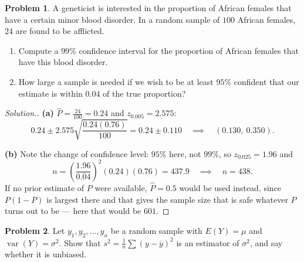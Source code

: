 \documentclass[11pt,a4paper]{article}
\theoremstyle{definition}
\newtheorem{problemx}{Problem}[section]
\newenvironment{problem}{\begin{problemx}}{\end{problemx}}
\newenvironment{solution}
  {\renewcommand{\qedsymbol}{}\begin{proof}[\textit{Solution}.]}
  {\end{proof}}
\begin{document}
\begin{problem}
A geneticist is interested in the proportion of African females that have a certain minor
blood disorder. In a random sample of $100$ African females, $24$ are found to be afflicted.
\begin{enumerate}
\item[(a).] Compute a $99\%$ confidence interval for the proportion of African females that
have this blood disorder.
\item[(b).] How large a sample is needed if we wish to be at least $95\%$ confident that our
estimate is within $0.04$ of the true proportion?
\end{enumerate}
\end{problem}

\begin{solution}
\textbf{(a)} $\hat{P}=\frac{24}{100}=0.24$ and $z_{0.005}=2.575$:
\[0.24\pm 2.575\sqrt{\frac{0.24(0.76)}{100}}=0.24\pm 0.110
\quad\implies\quad (0.130,\ 0.350).\]

\textbf{(b)} Note the change of confidence level: $95\%$ here, not $99\%$, so
$z_{0.025}=1.96$ and
\[n=\left(\frac{1.96}{0.04}\right)^2(0.24)(0.76)=437.9\quad\implies\quad n=438.\]
If no prior estimate of $P$ were available, $\hat{P}=0.5$ would be used instead, since
$P(1-P)$ is largest there and that gives the sample size that is safe whatever $P$ turns out
to be --- here that would be $601$.
\end{solution}

\begin{problem}
Let $y_1, y_2, \ldots, y_n$ be a random sample with $E(Y)=\mu$ and
$\operatorname{var}(Y)=\sigma^2$. Show that $s^2=\frac{1}{n}\sum(y-\overline{y})^2$ is an
estimator of $\sigma^2$, and say whether it is unbiased.
\end{problem}
\end{document}
